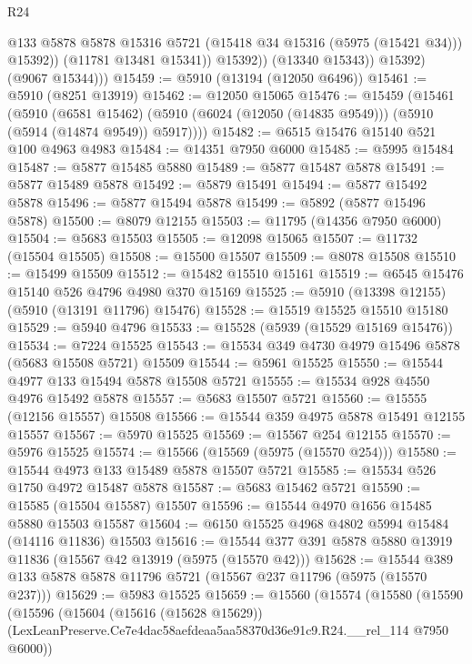 \begin{lexlean}{R24}
\begin{coremodule}
                      @133
                      @5878
                      @5878
                      @15316
                      @5721
                      (@15418 @34 @15316 (@5975 (@15421 @34)))
                      @15392))
                  (@11781 @13481 @15341))
                @15392))
            (@13340 @15343))
          @15392)
        (@9067 @15344)))
@15459 := @5910 (@13194 (@12050 @6496))
@15461 := @5910 (@8251 @13919)
@15462 := @12050 @15065
@15476 := @15459
    (@15461
      (@5910
        (@6581 @15462)
        (@5910 (@6024 (@12050 (@14835 @9549))) (@5910 (@5914 (@14874 @9549)) @5917))))
@15482 := @6515 @15476 @15140 @521 @100 @4963 @4983
@15484 := @14351 @7950 @6000
@15485 := @5995 @15484
@15487 := @5877 @15485 @5880
@15489 := @5877 @15487 @5878
@15491 := @5877 @15489 @5878
@15492 := @5879 @15491
@15494 := @5877 @15492 @5878
@15496 := @5877 @15494 @5878
@15499 := @5892 (@5877 @15496 @5878)
@15500 := @8079 @12155
@15503 := @11795 (@14356 @7950 @6000)
@15504 := @5683 @15503
@15505 := @12098 @15065
@15507 := @11732 (@15504 @15505)
@15508 := @15500 @15507
@15509 := @8078 @15508
@15510 := @15499 @15509
@15512 := @15482 @15510 @15161
@15519 := @6545 @15476 @15140 @526 @4796 @4980 @370 @15169
@15525 := @5910 (@13398 @12155) (@5910 (@13191 @11796) @15476)
@15528 := @15519 @15525 @15510 @15180
@15529 := @5940 @4796
@15533 := @15528 (@5939 (@15529 @15169 @15476))
@15534 := @7224 @15525
@15543 := @15534 @349 @4730 @4979 @15496 @5878 (@5683 @15508 @5721) @15509
@15544 := @5961 @15525
@15550 := @15544 @4977 @133 @15494 @5878 @15508 @5721
@15555 := @15534 @928 @4550 @4976 @15492 @5878
@15557 := @5683 @15507 @5721
@15560 := @15555 (@12156 @15557) @15508
@15566 := @15544 @359 @4975 @5878 @15491 @12155 @15557
@15567 := @5970 @15525
@15569 := @15567 @254 @12155
@15570 := @5976 @15525
@15574 := @15566 (@15569 (@5975 (@15570 @254)))
@15580 := @15544 @4973 @133 @15489 @5878 @15507 @5721
@15585 := @15534 @526 @1750 @4972 @15487 @5878
@15587 := @5683 @15462 @5721
@15590 := @15585 (@15504 @15587) @15507
@15596 := @15544 @4970 @1656 @15485 @5880 @15503 @15587
@15604 := @6150 @15525 @4968 @4802 @5994 @15484 (@14116 @11836) @15503
@15616 := @15544 @377 @391 @5878 @5880 @13919 @11836 (@15567 @42 @13919 (@5975 (@15570 @42)))
@15628 := @15544 @389 @133 @5878 @5878 @11796 @5721 (@15567 @237 @11796 (@5975 (@15570 @237)))
@15629 := @5983 @15525
@15659 := @15560
    (@15574
      (@15580
        (@15590
          (@15596
            (@15604
              (@15616 (@15628 @15629))
              (LexLeanPreserve.Ce7e4dac58aefdeaa5aa58370d36e91c9.R24.__rel_114 @7950 @6000))

\end{coremodule}
\end{lexlean}
